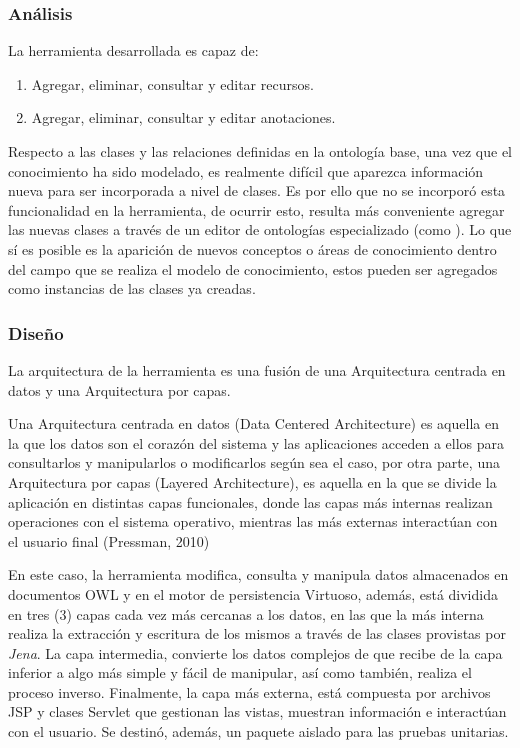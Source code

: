 \begin{itemize}
\subsubsection{Análisis}
La herramienta desarrollada es capaz de:

\begin{enumerate}
    \item Agregar, eliminar, consultar y editar recursos.
    \item Agregar, eliminar, consultar y editar anotaciones.
\end{enumerate}

Respecto a las clases y las relaciones definidas en la ontología base, una vez que el conocimiento ha sido modelado, es realmente difícil que aparezca información nueva para ser incorporada a nivel de clases. Es por ello que no se incorporó esta funcionalidad en la herramienta, de ocurrir esto, resulta más conveniente agregar las nuevas clases a través de un editor de ontologías especializado (como ). Lo que sí es posible es la aparición de nuevos conceptos o áreas de conocimiento dentro del campo que se realiza el modelo de conocimiento, estos pueden ser agregados como instancias de las clases ya creadas.

\subsubsection{Diseño}
La arquitectura de la herramienta es una fusión de una Arquitectura centrada en datos y una Arquitectura por capas.  

Una Arquitectura centrada en datos (Data Centered Architecture) es aquella en la que los datos son el corazón del sistema y las aplicaciones acceden a ellos para consultarlos y manipularlos o modificarlos según sea el caso, por otra parte, una Arquitectura por capas (Layered Architecture), es aquella en la que se divide la aplicación en distintas capas funcionales, donde las capas más internas realizan operaciones con el sistema operativo, mientras las más externas interactúan con el usuario final (Pressman, 2010)

En este caso, la herramienta modifica, consulta y manipula datos almacenados en documentos OWL y en el motor de persistencia Virtuoso, además, está dividida en tres (3) capas cada vez más cercanas a los datos, en las que la más interna realiza la extracción y escritura de los mismos a través de las clases provistas por \textit{Jena}. La capa intermedia, convierte los datos complejos de que recibe de la capa inferior a algo más simple y fácil de manipular, así como también, realiza el proceso inverso. Finalmente, la capa más externa, está compuesta por archivos JSP y clases Servlet que gestionan las vistas, muestran información e interactúan con el usuario. Se destinó, además, un paquete aislado para las pruebas unitarias.


\end{itemize}
